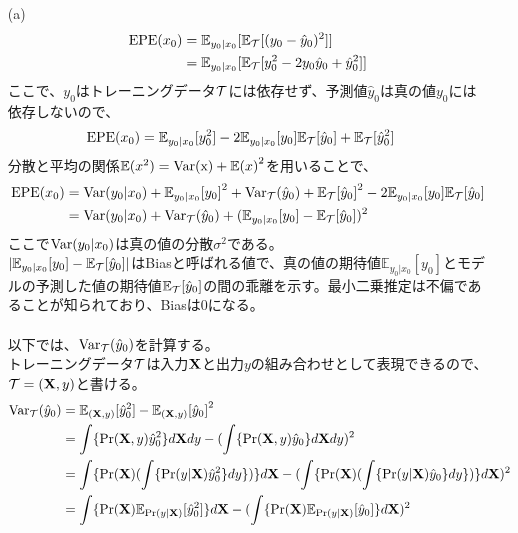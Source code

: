 \documentclass{jsarticle}
\begin{document}
\begin{enumerate}
\item[(a)]
\begin{align*}
{\rm EPE}(x_0)&=\mathbb{E}_{y_0|x_0}[\mathbb{E}_{\cal T}[(y_0-\hat{y}_0)^2]]\\
&=\mathbb{E}_{y_0|x_0}[\mathbb{E}_{\cal T}[y_0^2-2y_0 \hat{y}_0+\hat{y}_0^2]]
\end{align*}
ここで、$y_0$はトレーニングデータ${\cal T}$には依存せず、予測値$\hat{y}_0$は真の値$y_0$には依存しないので、
\begin{align*}
{\rm EPE}(x_0)&=\mathbb{E}_{y_0|x_0}[y_0^2]-2\mathbb{E}_{y_0|x_0}[y_0] \mathbb{E}_{\cal T}[\hat{y}_0]+\mathbb{E}_{\cal T}[\hat{y}_0^2]
\end{align*}
分散と平均の関係$\mathbb{E}(x^2)={\rm Var(x)}+{\mathbb{E}(x)}^2$を用いることで、
\begin{align*}
{\rm EPE}(x_0)&={\rm Var}(y_0|x_0)+{\mathbb{E}_{y_0|x_0}[y_0]}^2+{\rm Var}_{\cal T}(\hat{y}_0)+{\mathbb{E}_{\cal T}[\hat{y}_0]}^2-2\mathbb{E}_{y_0|x_0}[y_0] \mathbb{E}_{\cal T}[\hat{y}_0]\\
&={\rm Var}(y_0|x_0)+{\rm Var}_{\cal T}(\hat{y}_0)+({\mathbb{E}_{y_0|x_0}[y_0]}-{\mathbb{E}_{\cal T}[\hat{y}_0]})^2
\end{align*}
ここで${\rm Var}(y_0|x_0)$は真の値の分散$\sigma^2$である。\\
$|\mathbb{E}_{y_0|x_0}[y_0]-\mathbb{E}_{\cal T}[\hat{y}_0]|$はBiasと呼ばれる値で、真の値の期待値$\mathbb{E}_{y_0|x_0}[y_0]$とモデルの予測した値の期待値$\mathbb{E}_{\cal T}[\hat{y}_0]$の間の乖離を示す。最小二乗推定は不偏であることが知られており、Biasは0になる。\\
\\
以下では、${\rm Var}_{\cal T}(\hat{y}_0)$を計算する。\\
トレーニングデータ${\cal T}$は入力${\bf X}$と出力$y$の組み合わせとして表現できるので、${\cal T}=({\bf X},y)$と書ける。
\begin{align*}
{\rm Var}_{\cal T}(\hat{y}_0)&=\mathbb{E}_{({\bf X},y)}[\hat{y}_0^2]-{\mathbb{E}_{({\bf X},y)}[\hat{y}_0]}^2\\
&=\int \{\Pr({\bf X},y)\hat{y}_0^2 \}d{\bf X}dy-(\int\{ \Pr({\bf X},y)\hat{y}_0 \}d{\bf X}dy)^2\\
&=\int \{\Pr({\bf X})(\int \{\Pr(y|{\bf X})\hat{y}_0^2 \}dy\})\}d{\bf X}-(\int \{\Pr({\bf X})(\int \{\Pr(y|{\bf X})\hat{y}_0 \}dy\})\}d{\bf X})^2\\
&=\int \{\Pr({\bf X})\mathbb{E}_{\Pr(y|{\bf X})}[\hat{y}_0^2]\}d{\bf X}-(\int \{\Pr({\bf X})\mathbb{E}_{\Pr(y|{\bf X})}[\hat{y}_0]\}d{\bf X})^2\\

\end{align*}
\end{enumerate}
\end{document}
